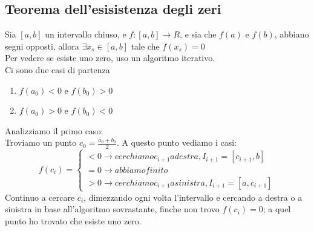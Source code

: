 \documentclass[11pt]{article}
\begin{document}
\subsection{Teorema dell'esisistenza degli zeri}
Sia $[a,b]$ un intervallo chiuso, e $f: [a,b] \rightarrow R$, e sia che $f(a)$ e $f(b)$, abbiano segni opposti, 
allora $\exists x_{s} \in [a,b]$ tale che $f(x_{s}) = 0$\\
Per vedere se esiste uno zero, uso un algoritmo iterativo.\\
Ci sono due casi di partenza
\begin{enumerate}
    \item $f(a_{0}) < 0$ e $f(b_{0}) > 0$
    \item $f(a_{0}) > 0$ e $f(b_{0}) < 0$
\end{enumerate}
Analizziamo il primo caso:\\
Troviamo un punto $c_{0} = \frac{a_{0} + b_{0}}{2}$. A questo punto vediamo i casi:
\[
  f(c_{i})=\begin{cases}
               < 0 \rightarrow cerchiamo c_{i+1} a destra, I_{i+1} = [c_{i+1},b]\\
               = 0 \rightarrow abbiamo finito\\
               > 0 \rightarrow cerchiamo c_{i+1} a sinistra, I_{i+1} = [a,c_{i+1}]
            \end{cases}
\]
Continuo a cercare $c_{i}$, dimezzando ogni volta l'intervallo e cercando a destra o a sinistra in base all'algoritmo 
sovrastante, finche non trovo $f(c_{i}) = 0$; a quel punto ho trovato che esiste uno zero.\\
\end{document}
